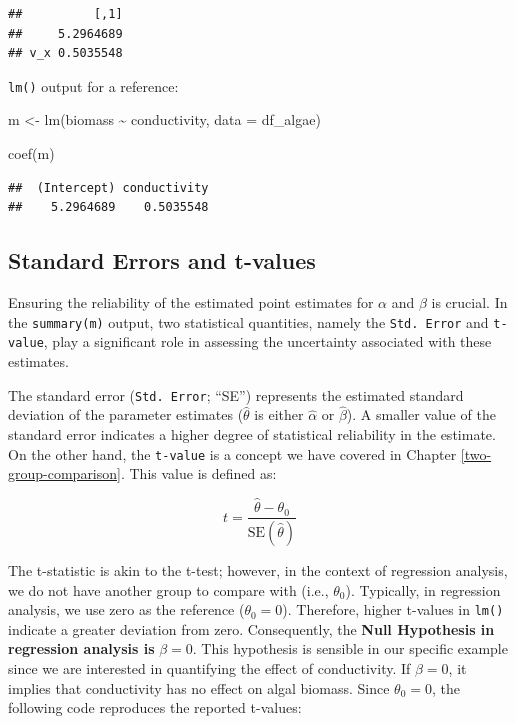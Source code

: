 \documentclass[
]{book}
\newenvironment{Shaded}{\begin{snugshade}}{\end{snugshade}}
\newcommand{\AttributeTok}[1]{\textcolor[rgb]{0.77,0.63,0.00}{#1}}
\newcommand{\FunctionTok}[1]{\textcolor[rgb]{0.00,0.00,0.00}{#1}}
\newcommand{\NormalTok}[1]{#1}
\newcommand{\OtherTok}[1]{\textcolor[rgb]{0.56,0.35,0.01}{#1}}
\newcommand{\SpecialCharTok}[1]{\textcolor[rgb]{0.00,0.00,0.00}{#1}}
\begin{document}
\begin{verbatim}
##          [,1]
##     5.2964689
## v_x 0.5035548
\end{verbatim}

\texttt{lm()} output for a reference:

\begin{Shaded}
\begin{Highlighting}[]
\NormalTok{m }\OtherTok{\textless{}{-}} \FunctionTok{lm}\NormalTok{(biomass }\SpecialCharTok{\textasciitilde{}}\NormalTok{ conductivity,}
        \AttributeTok{data =}\NormalTok{ df\_algae)}

\FunctionTok{coef}\NormalTok{(m)}
\end{Highlighting}
\end{Shaded}

\begin{verbatim}
##  (Intercept) conductivity 
##    5.2964689    0.5035548
\end{verbatim}

\hypertarget{standard-errors-and-t-values}{%
\subsection{Standard Errors and t-values}\label{standard-errors-and-t-values}}

Ensuring the reliability of the estimated point estimates for \(\alpha\) and \(\beta\) is crucial. In the \texttt{summary(m)} output, two statistical quantities, namely the \texttt{Std.\ Error} and \texttt{t-value}, play a significant role in assessing the uncertainty associated with these estimates.

The standard error (\texttt{Std.\ Error}; ``SE'') represents the estimated standard deviation of the parameter estimates (\(\hat{\theta}\) is either \(\hat{\alpha}\) or \(\hat{\beta}\)). A smaller value of the standard error indicates a higher degree of statistical reliability in the estimate. On the other hand, the \texttt{t-value} is a concept we have covered in Chapter \ref{two-group-comparison}. This value is defined as:

\[
t = \frac{\hat{\theta} - \theta_0}{\text{SE}(\hat{\theta})}
\]

The t-statistic is akin to the t-test; however, in the context of regression analysis, we do not have another group to compare with (i.e., \(\theta_0\)). Typically, in regression analysis, we use zero as the reference (\(\theta_0 = 0\)). Therefore, higher t-values in \texttt{lm()} indicate a greater deviation from zero. Consequently, the \textbf{Null Hypothesis in regression analysis is} \(\beta = 0\). This hypothesis is sensible in our specific example since we are interested in quantifying the effect of conductivity. If \(\beta = 0\), it implies that conductivity has no effect on algal biomass. Since \(\theta_0 = 0\), the following code reproduces the reported t-values:
\end{document}
